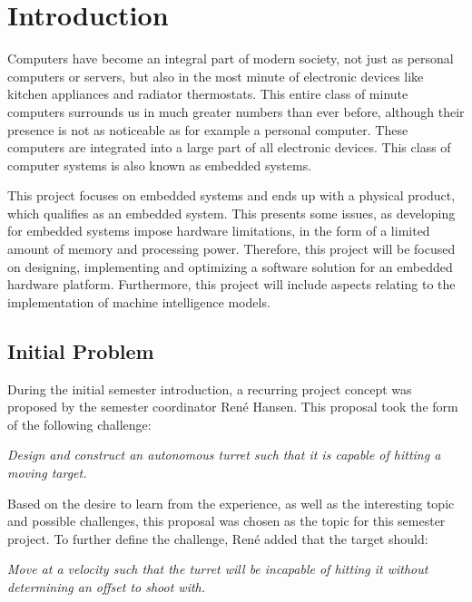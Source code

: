 \chapter{Introduction}
Computers have become an integral part of modern society, not just as personal
computers or servers, but also in the most minute of electronic devices
like kitchen appliances and radiator thermostats. This entire class of minute
computers surrounds us in much greater numbers than ever before, although their
presence is not as noticeable as for example a personal computer. These
computers are integrated into a large part of all electronic devices. This class
of computer systems is also known as embedded systems.\nl


This project focuses on embedded systems and ends up with a physical product,
which qualifies as an embedded system. This presents some issues, as
developing for embedded systems impose hardware limitations, in the form of a
limited amount of memory and processing power. Therefore, this project will be
focused on designing, implementing and optimizing a software solution for an
embedded hardware platform. Furthermore, this project will include
aspects relating to the implementation of machine intelligence models.

\section{Initial Problem}\label{InitialProblem}
During the initial semester introduction, a recurring project concept was
proposed by the semester coordinator Ren\'e Hansen. This proposal took the
form of the following challenge:

\begin{center}
\begin{minipage}{0.8\linewidth}
\textit{Design and construct an autonomous turret such that it is capable of
hitting a moving target.}
\end{minipage}
\end{center}

Based on the desire to learn from the experience, as well as the interesting
topic and possible challenges, this proposal was chosen as the topic for this
semester project. To further define the challenge, Ren\'e added that the target
should:
\begin{center}
\begin{minipage}{0.8\linewidth}
\textit{Move at a velocity such that the turret will be incapable
of hitting it without determining an offset to shoot with.}
\end{minipage}
\end{center}

